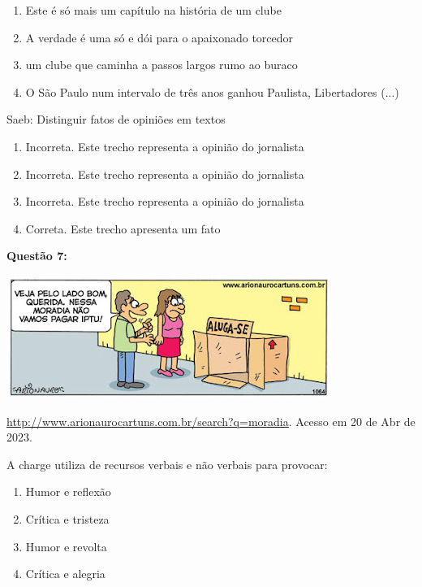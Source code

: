 {\begin{enumerate}
\def\labelenumi{\alph{enumi})}
\item
  Este é só mais um capítulo na história de um clube
\item
  A verdade é uma só e dói para o apaixonado torcedor
\item
  um clube que caminha a passos largos rumo ao buraco
\item
  O São Paulo num intervalo de três anos ganhou Paulista, Libertadores
  (...)
\end{enumerate}

Saeb: Distinguir fatos de opiniões em textos

\begin{enumerate}
\def\labelenumi{\arabic{enumi}.}
\item
  Incorreta. Este trecho representa a opinião do jornalista
\item
  Incorreta. Este trecho representa a opinião do jornalista
\item
  Incorreta. Este trecho representa a opinião do jornalista
\item
  Correta. Este trecho apresenta um fato
\end{enumerate}

\textbf{Questão 7:}

\includegraphics[width=4.16667in,height=1.57292in]{./imgSAEB_7_POR/media/image17.png}

\href{http://www.arionaurocartuns.com.br/search?q=moradia}{\uline{http://www.arionaurocartuns.com.br/search?q=moradia}}.
Acesso em 20 de Abr de 2023.

A charge utiliza de recursos verbais e não verbais para provocar:

\begin{enumerate}
\def\labelenumi{\alph{enumi})}
\item
  Humor e reflexão
\item
  Crítica e tristeza
\item
  Humor e revolta
\item
  Crítica e alegria
\end{enumerate}

}
